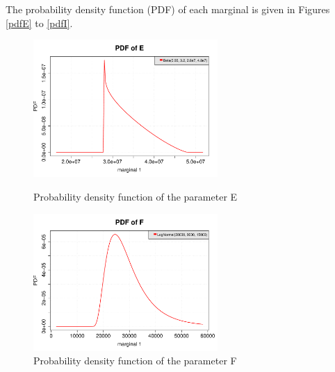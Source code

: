\documentclass[11pt]{article}
\begin{document}
The probability density function (PDF) of each marginal is given in Figures \ref{pdfE} to \ref{pdfI}.


\begin{figure}[Hhbtp]
  \begin{minipage}{9.8cm}
    \begin{center}
      \includegraphics[width=7cm]{Figures/distributionE_pdf.pdf}
      \caption{Probability density function of the parameter E}
      \label{pdfE}
    \end{center}
  \end{minipage}
  \hfill
  \begin{minipage}{9.8cm}
    \begin{center}
      \includegraphics[width=7cm]{Figures/distributionF_pdf.pdf}
      \caption{Probability density function of the parameter F}
      \label{pdfF}
    \end{center}
  \end{minipage}
\end{figure}
\end{document}
